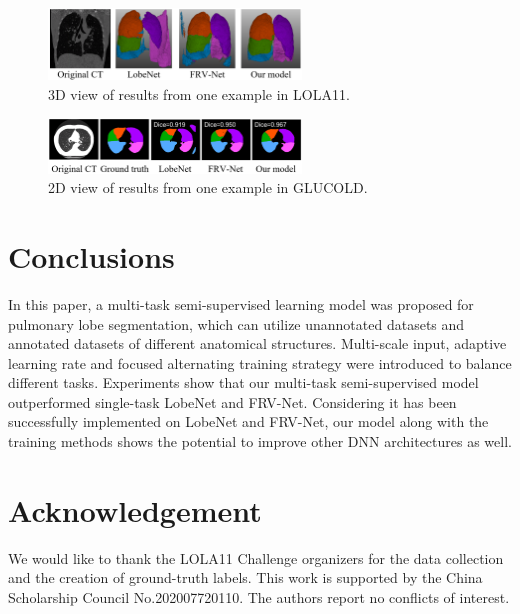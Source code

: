 \begin{figure}[tb]
    \centering
    \includegraphics[width=0.6\textwidth]{3d_compare.png}
    \caption{3D view of results from one example in LOLA11.}
    \label{fig:chap2_3d}
\end{figure}

\begin{figure}[tb]
    \centering
    \includegraphics[width=0.6\textwidth]{2d_compare.png}
    \caption{2D view of results from one example in GLUCOLD.}
    \label{fig:chap2_2d}
\end{figure}



\section{Conclusions}
In this paper, a multi-task semi-supervised learning model was proposed for pulmonary lobe segmentation, which can utilize unannotated datasets and annotated datasets of different anatomical structures. Multi-scale input, adaptive learning rate and focused alternating training strategy were introduced to balance different tasks. Experiments show that our multi-task semi-supervised model outperformed single-task LobeNet and FRV-Net. Considering it has been successfully implemented on LobeNet and FRV-Net, our model along with the training methods shows the potential to improve other DNN architectures as well. 


\section*{Acknowledgement}
We would like to thank the LOLA11 Challenge organizers for the data collection and the creation of ground-truth labels. This work is supported by the China Scholarship Council
No.202007720110. The authors report no conflicts of interest.

